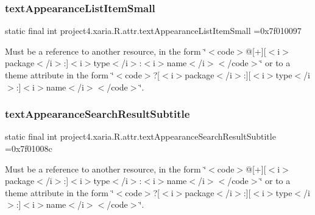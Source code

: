 \subsubsection{\texorpdfstring{text\+Appearance\+List\+Item\+Small}{textAppearanceListItemSmall}}
{\footnotesize\ttfamily static final int project4.\+xaria.\+R.\+attr.\+text\+Appearance\+List\+Item\+Small =0x7f010097\hspace{0.3cm}{\ttfamily [static]}}

Must be a reference to another resource, in the form \char`\"{}$<$code$>$@\mbox{[}+\mbox{]}\mbox{[}$<$i$>$package$<$/i$>$\+:\mbox{]}$<$i$>$type$<$/i$>$\+:$<$i$>$name$<$/i$>$$<$/code$>$\char`\"{} or to a theme attribute in the form \char`\"{}$<$code$>$?\mbox{[}$<$i$>$package$<$/i$>$\+:\mbox{]}\mbox{[}$<$i$>$type$<$/i$>$\+:\mbox{]}$<$i$>$name$<$/i$>$$<$/code$>$\char`\"{}. \mbox{\label{classproject4_1_1xaria_1_1R_1_1attr_a208b343559a51b1bb02db5718f6ab31d}} 
\subsubsection{\texorpdfstring{text\+Appearance\+Search\+Result\+Subtitle}{textAppearanceSearchResultSubtitle}}
{\footnotesize\ttfamily static final int project4.\+xaria.\+R.\+attr.\+text\+Appearance\+Search\+Result\+Subtitle =0x7f01008c\hspace{0.3cm}{\ttfamily [static]}}

Must be a reference to another resource, in the form \char`\"{}$<$code$>$@\mbox{[}+\mbox{]}\mbox{[}$<$i$>$package$<$/i$>$\+:\mbox{]}$<$i$>$type$<$/i$>$\+:$<$i$>$name$<$/i$>$$<$/code$>$\char`\"{} or to a theme attribute in the form \char`\"{}$<$code$>$?\mbox{[}$<$i$>$package$<$/i$>$\+:\mbox{]}\mbox{[}$<$i$>$type$<$/i$>$\+:\mbox{]}$<$i$>$name$<$/i$>$$<$/code$>$\char`\"{}. \mbox{\label{classproject4_1_1xaria_1_1R_1_1attr_ac9f1e943ab31ca81504612761ea2ee1f}} 
